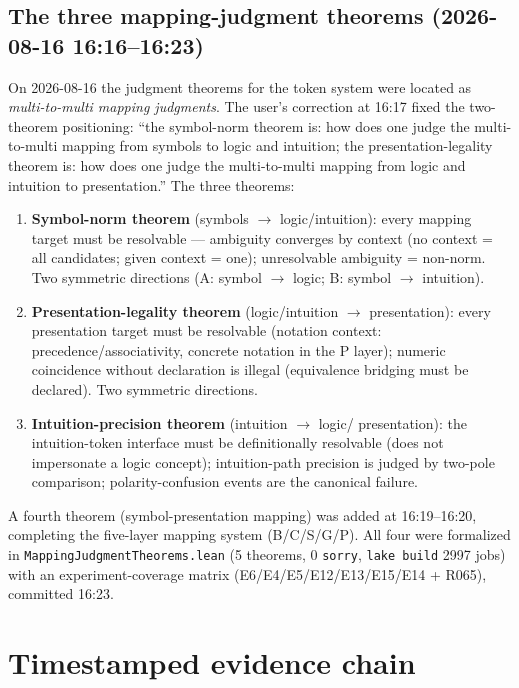 \documentclass[sigplan,10pt,anonymous,review]{acmart}
\begin{document}
\subsection{The three mapping-judgment theorems (2026-08-16 16:16--16:23)}

On 2026-08-16 the judgment theorems for the token system were located as
\emph{multi-to-multi mapping judgments}. The user's correction at 16:17
fixed the two-theorem positioning:
``the symbol-norm theorem is: how does one judge the multi-to-multi mapping
from symbols to logic and intuition; the presentation-legality theorem is:
how does one judge the multi-to-multi mapping from logic and intuition to
presentation.'' The three theorems:

\begin{enumerate}
\item \textbf{Symbol-norm theorem} (symbols $\to$ logic/intuition): every
  mapping target must be resolvable --- ambiguity converges by context
  (no context = all candidates; given context = one); unresolvable
  ambiguity = non-norm. Two symmetric directions (A: symbol $\to$ logic;
  B: symbol $\to$ intuition).
\item \textbf{Presentation-legality theorem} (logic/intuition $\to$
  presentation): every presentation target must be resolvable (notation
  context: precedence/associativity, concrete notation in the P layer);
  numeric coincidence without declaration is illegal (equivalence bridging
  must be declared). Two symmetric directions.
\item \textbf{Intuition-precision theorem} (intuition $\to$ logic/
  presentation): the intuition-token interface must be definitionally
  resolvable (does not impersonate a logic concept); intuition-path
  precision is judged by two-pole comparison; polarity-confusion events are
  the canonical failure.
\end{enumerate}

A fourth theorem (symbol-presentation mapping) was added at 16:19--16:20,
completing the five-layer mapping system (B/C/S/G/P). All four were
formalized in \texttt{MappingJudgmentTheorems.lean} (5 theorems, 0
\texttt{sorry}, \texttt{lake build} 2997 jobs) with an experiment-coverage
matrix (E6/E4/E5/E12/E13/E15/E14 + R065), committed 16:23.

\section{Timestamped evidence chain}
\end{document}
